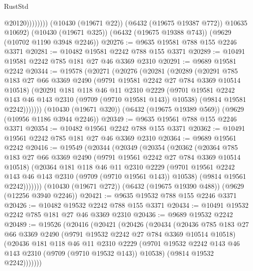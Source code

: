 \begin{lexlean}{RustStd}
\begin{coremodule}
                      @20120))))))))
      (@10430 (@19671 @22))
      (@6432 (@19675 @19387 @772))
      @10635
      @10692)
    (@10430 (@19671 @325))
    (@6432 (@19675 @19388 @743))
    (@9629 (@10702 @1190 @3948 @2246))
@20276 := @9635 @19581 @788 @155 @2246 @3371
@20281 := @10482 @19581 @2242 @788 @155 @3371
@20289 := @10491 @19581 @2242 @785 @181 @27 @46 @3369 @2310
@20291 := @9689 @19581 @2242
@20344 := @19578
    (@20271
      (@20276
        (@20281
          (@20289
            (@20291
              @785
              @183
              @27
              @66
              @3369
              @2490
              (@9791 @19581 @2242 @27 @784 @3369 @10514 @10518)
              (@20291
                @181
                @118
                @46
                @11
                @2310
                @2229
                (@9701 @19581 @2242 @143 @46 @143 @2310 (@9709 (@9710 @19581 @143)) @10538)
                (@9814 @19581 @2242)))))))
    (@10430 (@19671 @320))
    (@6432 (@19675 @19389 @569))
    (@9629 (@10956 @1186 @3944 @2246))
@20349 := @9635 @19561 @788 @155 @2246 @3371
@20354 := @10482 @19561 @2242 @788 @155 @3371
@20362 := @10491 @19561 @2242 @785 @181 @27 @46 @3369 @2310
@20364 := @9689 @19561 @2242
@20416 := @19549
    (@20344
      (@20349
        (@20354
          (@20362
            (@20364
              @785
              @183
              @27
              @66
              @3369
              @2490
              (@9791 @19561 @2242 @27 @784 @3369 @10514 @10518)
              (@20364
                @181
                @118
                @46
                @11
                @2310
                @2229
                (@9701 @19561 @2242 @143 @46 @143 @2310 (@9709 (@9710 @19561 @143)) @10538)
                (@9814 @19561 @2242)))))))
    (@10430 (@19671 @272))
    (@6432 (@19675 @19390 @488))
    (@9629 (@12256 @3940 @2246))
@20421 := @9635 @19532 @788 @155 @2246 @3371
@20426 := @10482 @19532 @2242 @788 @155 @3371
@20434 := @10491 @19532 @2242 @785 @181 @27 @46 @3369 @2310
@20436 := @9689 @19532 @2242
@20489 := @19526
    (@20416
      (@20421
        (@20426
          (@20434
            (@20436
              @785
              @183
              @27
              @66
              @3369
              @2490
              (@9791 @19532 @2242 @27 @784 @3369 @10514 @10518)
              (@20436
                @181
                @118
                @46
                @11
                @2310
                @2229
                (@9701 @19532 @2242 @143 @46 @143 @2310 (@9709 (@9710 @19532 @143)) @10538)
                (@9814 @19532 @2242)))))))

\end{coremodule}
\end{lexlean}

